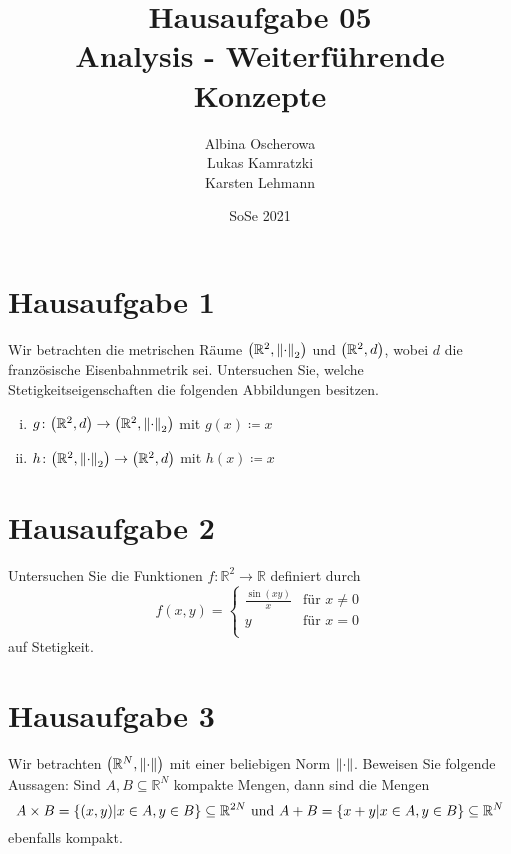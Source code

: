\documentclass{scrreprt}
\author{Albina Oscherowa \\ Lukas Kamratzki \\ Karsten Lehmann}
\date{SoSe 2021}
\title{Hausaufgabe 05 \\Analysis - Weiterführende Konzepte}
\begin{document}
\section*{Hausaufgabe 1}

Wir betrachten die metrischen Räume $\qty(\mathbb{R}^2, \norm{\cdot}_2)$ und
$\qty(\mathbb{R}^2, d)$, wobei $d$ die französische Eisenbahnmetrik sei.
Untersuchen Sie, welche Stetigkeitseigenschaften die folgenden Abbildungen
besitzen.
\begin{enumerate}[(i)]
\item $g \colon \qty(\mathbb{R}^2, d) \to \qty(\mathbb{R}^2, \norm{\cdot}_2)$
  mit $g(x) \coloneqq x$
\item $h \colon \qty(\mathbb{R}^2, \norm{\cdot}_2) \to \qty(\mathbb{R}^2, d)$
  mit $h(x) \coloneqq x$
\end{enumerate}

\section*{Hausaufgabe 2}

Untersuchen Sie die Funktionen $f \colon \mathbb{R}^2 \to \mathbb{R}$ definiert
durch
\[
  f(x, y) = \begin{cases}
    \frac{\sin(xy)}{x} & \text{für } x \ne 0 \\
    y & \text{für } x = 0 \\
  \end{cases}
\]
auf Stetigkeit.

\section*{Hausaufgabe 3}

Wir betrachten $\qty(\mathbb{R}^N, \norm{\cdot})$ mit einer beliebigen Norm
$\norm{\cdot}$.
Beweisen Sie folgende Aussagen: Sind $A, B \subseteq \mathbb{R}^N$ kompakte
Mengen, dann sind die Mengen
\[
  A \times B = \qty{(x, y) \middle| x \in A, y \in B} \subseteq \mathbb{R}^{2N}
  \text{ und }
  A + B = \qty{x + y \middle| x \in A, y \in B} \subseteq \mathbb{R}^N
\]
ebenfalls kompakt.
\end{document}
